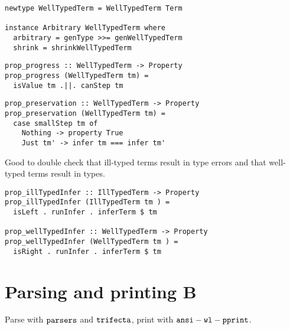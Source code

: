 \documentclass[aspectration=169]{beamer}
\begin{document}
\begin{frame}[fragile]
  \begin{verbatim}
newtype WellTypedTerm = WellTypedTerm Term

instance Arbitrary WellTypedTerm where
  arbitrary = genType >>= genWellTypedTerm
  shrink = shrinkWellTypedTerm
  \end{verbatim}
\end{frame}

\begin{frame}[fragile]
  \begin{verbatim}
prop_progress :: WellTypedTerm -> Property
prop_progress (WellTypedTerm tm) =
  isValue tm .||. canStep tm
  \end{verbatim}
\end{frame} 

\begin{frame}[fragile]
  \begin{verbatim}
prop_preservation :: WellTypedTerm -> Property
prop_preservation (WellTypedTerm tm) =
  case smallStep tm of
    Nothing -> property True
    Just tm' -> infer tm === infer tm'
  \end{verbatim}
\end{frame} 

\begin{frame}[fragile]
  \begin{center}
   Good to double check that ill-typed terms result in type errors and that well-typed terms
   result in types.
  \end{center}
  \begin{verbatim}
prop_illTypedInfer :: IllTypedTerm -> Property
prop_illTypedInfer (IllTypedTerm tm ) =
  isLeft . runInfer . inferTerm $ tm

prop_wellTypedInfer :: WellTypedTerm -> Property
prop_wellTypedInfer (WellTypedTerm tm ) =
  isRight . runInfer . inferTerm $ tm
  \end{verbatim}
\end{frame} 

\section{Parsing and printing B}

\begin{frame}[c]
  \begin{center}
Parse with $\tt{parsers}$ and $\tt{trifecta}$, print with $\tt{ansi-wl-pprint}$.
  \end{center}
\end{frame}
\end{document}
